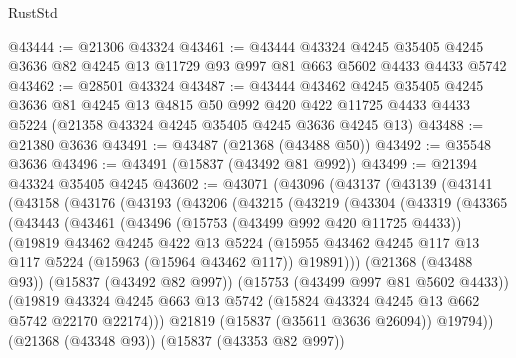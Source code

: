 \begin{lexlean}{RustStd}
\begin{coremodule}
{\begin{coremodule}
{{{{{{{{{{{{{{{{{{{{{{{{{{{{{{{{{{{{{{{{{{{{{{{{{{{{{{{{{{{{@43444 := @21306 @43324
@43461 := @43444
    @43324
    @4245
    @35405
    @4245
    @3636
    @82
    @4245
    @13
    @11729
    @93
    @997
    @81
    @663
    @5602
    @4433
    @4433
    @5742
@43462 := @28501 @43324
@43487 := @43444
    @43462
    @4245
    @35405
    @4245
    @3636
    @81
    @4245
    @13
    @4815
    @50
    @992
    @420
    @422
    @11725
    @4433
    @4433
    @5224
    (@21358 @43324 @4245 @35405 @4245 @3636 @4245 @13)
@43488 := @21380 @3636
@43491 := @43487 (@21368 (@43488 @50))
@43492 := @35548 @3636
@43496 := @43491 (@15837 (@43492 @81 @992))
@43499 := @21394 @43324 @35405 @4245
@43602 := @43071
    (@43096
      (@43137
        (@43139
          (@43141
            (@43158
              (@43176
                (@43193
                  (@43206
                    (@43215
                      (@43219
                        (@43304
                          (@43319
                            (@43365
                              (@43443
                                (@43461
                                  (@43496
                                    (@15753 (@43499 @992 @420 @11725 @4433))
                                    (@19819
                                      @43462
                                      @4245
                                      @422
                                      @13
                                      @5224
                                      (@15955
                                        @43462
                                        @4245
                                        @117
                                        @13
                                        @117
                                        @5224
                                        (@15963 (@15964 @43462 @117))
                                        @19891)))
                                  (@21368 (@43488 @93))
                                  (@15837 (@43492 @82 @997))
                                  (@15753 (@43499 @997 @81 @5602 @4433))
                                  (@19819
                                    @43324
                                    @4245
                                    @663
                                    @13
                                    @5742
                                    (@15824 @43324 @4245 @13 @662 @5742 @22170 @22174)))
                                @21819
                                (@15837 (@35611 @3636 @26094))
                                @19794))
                            (@21368 (@43348 @93))
                            (@15837 (@43353 @82 @997))
}}}}}}}}}}}}}}}}}}}}}}}}}}}}}}}}}}}}}}}}}}}}}}}}}}}}}}}}}}}}
\end{coremodule}}
\end{coremodule}
\end{lexlean}
